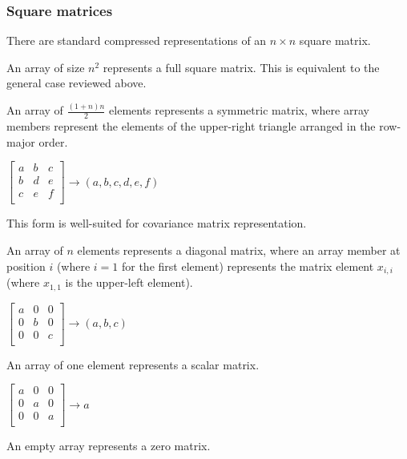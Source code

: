 \subsubsection{Square matrices}

There are standard compressed representations of an $n \times n$ square matrix.

An array of size $n^2$ represents a full square matrix.
This is equivalent to the general case reviewed above.

An array of $\frac{(1 + n) n}{2}$ elements represents a symmetric matrix,
where array members represent the elements of the upper-right triangle arranged in the row-major order.
\begin{remark}
    $
    \begin{bmatrix}
        a & b & c \\
        b & d & e \\
        c & e & f \\
    \end{bmatrix} \rightarrow \left(a, b, c, d, e, f\right)
    $

    This form is well-suited for covariance matrix representation.
\end{remark}

An array of $n$ elements represents a diagonal matrix,
where an array member at position $i$ (where $i=1$ for the first element)
represents the matrix element $x_{i, i}$ (where $x_{1, 1}$ is the upper-left element).
\begin{remark}
    $
    \begin{bmatrix}
        a & 0 & 0 \\
        0 & b & 0 \\
        0 & 0 & c \\
    \end{bmatrix} \rightarrow \left(a, b, c\right)
    $
\end{remark}

An array of one element represents a scalar matrix.
\begin{remark}
    $
    \begin{bmatrix}
        a & 0 & 0 \\
        0 & a & 0 \\
        0 & 0 & a \\
    \end{bmatrix} \rightarrow a
    $
\end{remark}

An empty array represents a zero matrix.

